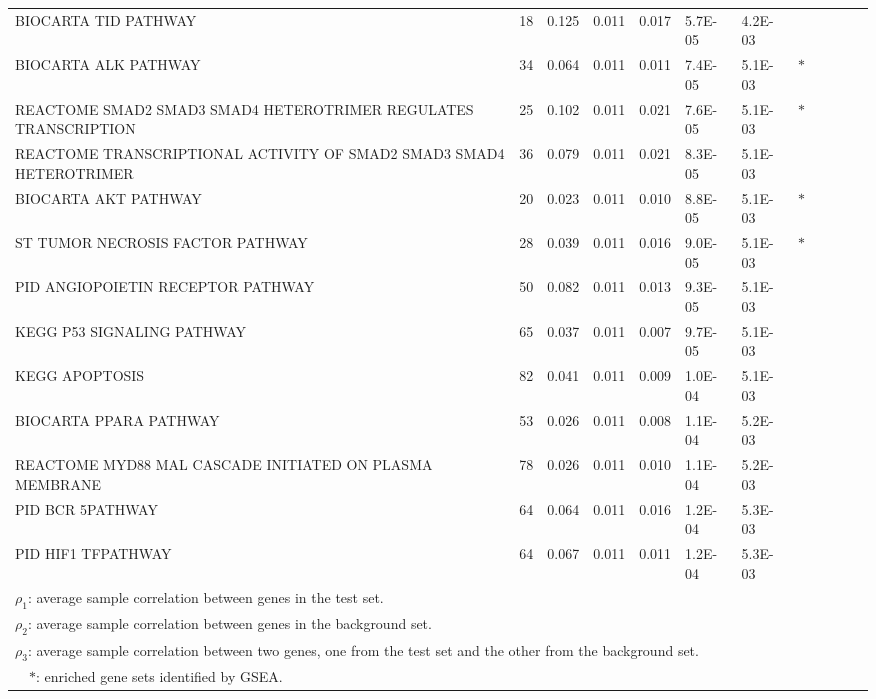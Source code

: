 \documentclass[11pt, a4paper]{article}
\begin{document}
{\begin{longtable}{p{3in}rp{0.5in}p{0.5in}rp{0.5in}p{0.5in}rp{0.5in}p{0.5in}lp{0.1in}}
		BIOCARTA TID PATHWAY & 18 & 0.125 & 0.011 & 0.017 & 5.7E-05 & 4.2E-03 &  \\ 
		BIOCARTA ALK PATHWAY & 34 & 0.064 & 0.011 & 0.011 & 7.4E-05 & 5.1E-03 & $\ast$ \\ 
		REACTOME SMAD2 SMAD3 SMAD4 HETEROTRIMER REGULATES TRANSCRIPTION & 25 & 0.102 & 0.011 & 0.021 & 7.6E-05 & 5.1E-03 & $\ast$ \\ 
		REACTOME TRANSCRIPTIONAL ACTIVITY OF SMAD2 SMAD3 SMAD4 HETEROTRIMER & 36 & 0.079 & 0.011 & 0.021 & 8.3E-05 & 5.1E-03 &  \\ 
		BIOCARTA AKT PATHWAY & 20 & 0.023 & 0.011 & 0.010 & 8.8E-05 & 5.1E-03 & $\ast$ \\ 
		ST TUMOR NECROSIS FACTOR PATHWAY & 28 & 0.039 & 0.011 & 0.016 & 9.0E-05 & 5.1E-03 & $\ast$ \\ 
		PID ANGIOPOIETIN RECEPTOR PATHWAY & 50 & 0.082 & 0.011 & 0.013 & 9.3E-05 & 5.1E-03 &  \\ 
		KEGG P53 SIGNALING PATHWAY & 65 & 0.037 & 0.011 & 0.007 & 9.7E-05 & 5.1E-03 &  \\ 
		KEGG APOPTOSIS & 82 & 0.041 & 0.011 & 0.009 & 1.0E-04 & 5.1E-03 &  \\ 
		BIOCARTA PPARA PATHWAY & 53 & 0.026 & 0.011 & 0.008 & 1.1E-04 & 5.2E-03 &  \\ 
		REACTOME MYD88 MAL CASCADE INITIATED ON PLASMA MEMBRANE & 78 & 0.026 & 0.011 & 0.010 & 1.1E-04 & 5.2E-03 &  \\ 
		PID BCR 5PATHWAY & 64 & 0.064 & 0.011 & 0.016 & 1.2E-04 & 5.3E-03 &  \\ 
		PID HIF1 TFPATHWAY & 64 & 0.067 & 0.011 & 0.011 & 1.2E-04 & 5.3E-03 &  \\ 
		
		\hline	
				\hline
		\multicolumn{7}{l}{$\rho_1$: average sample correlation between genes in the test set. }	 \\	
		\multicolumn{7}{l}{$\rho_2$: average sample correlation between genes in the background set. }	 \\	
		\multicolumn{7}{l}{$\rho_3$: average sample correlation between two genes, one from the test set and the other from the background set. }	 \\	
		\multicolumn{7}{l}{ ~~$\ast$: enriched gene sets identified by GSEA.}	 \\	
				\end{longtable}
		}
		

		 	
\end{document}
